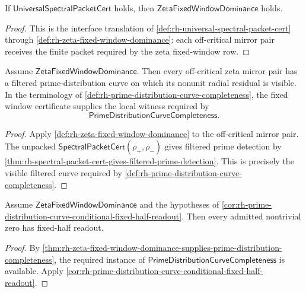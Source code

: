 \begin{theorem}
\label{thm:rh-universal-spectral-packets-supply-fixed-window-dominance}
If $\mathsf{UniversalSpectralPacketCert}$ holds, then
$\mathsf{ZetaFixedWindowDominance}$ holds.
\end{theorem}

\begin{proof}
This is the interface translation of
\autoref{def:rh-universal-spectral-packet-cert} through
\autoref{def:rh-zeta-fixed-window-dominance}: each off-critical mirror
pair receives the finite packet required by the zeta fixed-window row.
\end{proof}

\begin{theorem}
\label{thm:rh-zeta-fixed-window-dominance-supplies-prime-distribution-completeness}
Assume $\mathsf{ZetaFixedWindowDominance}$.  Then every off-critical
zeta mirror pair has a filtered prime-distribution curve on which its
nonunit radial residual is visible.  In the terminology of
\autoref{def:rh-prime-distribution-curve-completeness}, the fixed window
certificate supplies the local witness required by
$$
\mathsf{PrimeDistributionCurveCompleteness}.
$$
\end{theorem}

\begin{proof}
Apply \autoref{def:rh-zeta-fixed-window-dominance} to the off-critical
mirror pair.  The unpacked
$\mathsf{SpectralPacketCert}(\rho_+,\rho_-)$ gives filtered prime
detection by
\autoref{thm:rh-spectral-packet-cert-gives-filtered-prime-detection}.
This is precisely the visible filtered curve required by
\autoref{def:rh-prime-distribution-curve-completeness}.
\end{proof}

\begin{corollary}
\label{cor:rh-fixed-window-route-conditional-fixed-half-readout}
Assume $\mathsf{ZetaFixedWindowDominance}$ and the hypotheses of
\autoref{cor:rh-prime-distribution-curve-conditional-fixed-half-readout}.
Then every admitted nontrivial zero has fixed-half readout.
\end{corollary}

\begin{proof}
By
\autoref{thm:rh-zeta-fixed-window-dominance-supplies-prime-distribution-completeness},
the required instance of
$\mathsf{PrimeDistributionCurveCompleteness}$ is available.  Apply
\autoref{cor:rh-prime-distribution-curve-conditional-fixed-half-readout}.
\end{proof}

